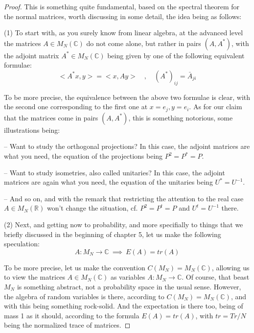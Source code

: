 \documentclass[12pt]{amsbook}
\begin{document}
\begin{proof}
This is something quite fundamental, based on the spectral theorem for the normal matrices, worth discussing in some detail, the idea being as follows:

\medskip

(1) To start with, as you surely know from linear algebra, at the advanced level the matrices $A\in M_N(\mathbb C)$ do not come alone, but rather in pairs $(A,A^*)$, with the adjoint matrix $A^*\in M_N(\mathbb C)$ being given by one of the following equivalent formulae:
$$<A^*x,y>=<x,Ay>\quad,\quad (A^*)_{ij}=\bar{A}_{ji}$$

To be more precise, the equivalence between the above two formulae is clear, with the second one corresponding to the first one at $x=e_j,y=e_i$. As for our claim that the matrices come in pairs $(A,A^*)$, this is something notorious, some illustrations being:

\medskip

-- Want to study the orthogonal projections? In this case, the adjoint matrices are what you need, the equation of the projections being $P^2=P^*=P$.

\medskip

-- Want to study isometries, also called unitaries? In this case, the adjoint matrices are again what you need, the equation of the unitaries being $U^*=U^{-1}$.

\medskip

-- And so on, and with the remark that restricting the attention to the real case $A\in M_N(\mathbb R)$ won't change the situation, cf. $P^2=P^t=P$ and $U^t=U^{-1}$ there.

\medskip

(2) Next, and getting now to probability, and more specifially to things that we briefly discussed in the beginning of chapter 5, let us make the following speculation:
$$A:M_N\to\mathbb C\ \implies\ E(A)=tr(A)$$

To be more precise, let us make the convention $C(M_N)=M_N(\mathbb C)$, allowing us to view the matrices $A\in M_N(\mathbb C)$ as variables $A:M_N\to\mathbb C$. Of course, that beast $M_N$ is something abstract, not a probability space in the usual sense. However, the algebra of random variables is there, according to $C(M_N)=M_N(\mathbb C)$, and with this being something rock-solid. And the expectation is there too, being of mass 1 as it should, according to the formula $E(A)=tr(A)$, with $tr=Tr/N$ being the normalized trace of matrices. 


\end{proof}
\end{document}
